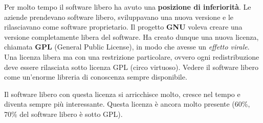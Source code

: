 Per molto tempo il software libero ha avuto una \textbf{posizione di inferiorità}. Le aziende prendevano software libero, sviluppavano una nuova versione e le rilasciavano come software proprietario. Il progetto \textbf{GNU} voleva creare una versione completamente libera del software. Ha creato dunque una nuova licenza, chiamata \textbf{GPL} (General Public License), in modo che avesse un \textit{effetto virale}. Una licenza libera ma con una restrizione particolare, ovvero ogni redistribuzione deve essere rilasciata sotto licenza GPL (circo virtuoso). Vedere il software libero come un'enorme libreria di conoscenza sempre disponibile.

Il software libero con questa licenza si arricchisce molto, cresce nel tempo e diventa sempre più interessante. Questa licenza è ancora molto presente (60\%, 70\% del software libero è sotto GPL).